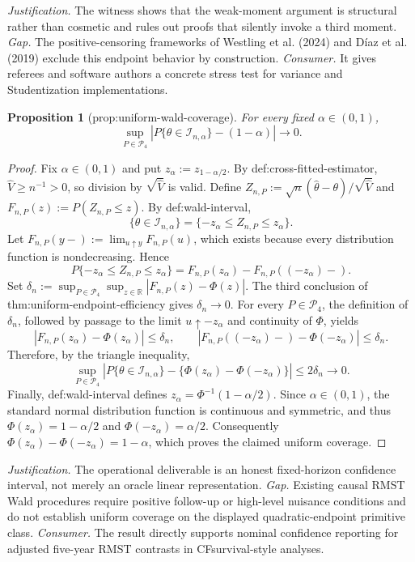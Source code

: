 \documentclass{article}
\newtheorem{proposition}{Proposition}
\begin{document}
\par\smallskip\noindent \textit{Justification.} The witness shows that the weak-moment argument is structural rather than cosmetic and rules out proofs that silently invoke a third moment. \textit{Gap.} The positive-censoring frameworks of Westling et al. (2024) and Díaz et al. (2019) exclude this endpoint behavior by construction. \textit{Consumer.} It gives referees and software authors a concrete stress test for variance and Studentization implementations.

\begin{proposition}[prop:uniform-wald-coverage]\label{prop:uniform-wald-coverage}
For every fixed \(\alpha\in(0,1)\), \[\sup_{P\in\mathcal P_4}\left|P\{\theta\in\mathcal I_{n,\alpha}\}-(1-\alpha)\right|\to0.\]
\end{proposition}
\begin{proof}
Fix \(\alpha\in(0,1)\) and put \(z_\alpha:=z_{1-\alpha/2}\). By def:cross-fitted-estimator, \(\widehat V\ge n^{-1}>0\), so division by \(\sqrt{\widehat V}\) is valid. Define \(Z_{n,P}:=\sqrt n(\widehat\theta-\theta)/\sqrt{\widehat V}\) and \(F_{n,P}(z):=P(Z_{n,P}\le z)\). By def:wald-interval,\[\{\theta\in\mathcal I_{n,\alpha}\}=\{-z_\alpha\le Z_{n,P}\le z_\alpha\}.\]Let \(F_{n,P}(y-) := \lim_{u\uparrow y}F_{n,P}(u)\), which exists because every distribution function is nondecreasing. Hence\[P\{-z_\alpha\le Z_{n,P}\le z_\alpha\}=F_{n,P}(z_\alpha)-F_{n,P}((-z_\alpha)-).\]Set \(\delta_n:=\sup_{P\in\mathcal P_4}\sup_{z\in\mathbb R}|F_{n,P}(z)-\Phi(z)|\). The third conclusion of thm:uniform-endpoint-efficiency gives \(\delta_n\to0\). For every \(P\in\mathcal P_4\), the definition of \(\delta_n\), followed by passage to the limit \(u\uparrow-z_\alpha\) and continuity of \(\Phi\), yields\[|F_{n,P}(z_\alpha)-\Phi(z_\alpha)|\le\delta_n,\qquad |F_{n,P}((-z_\alpha)-)-\Phi(-z_\alpha)|\le\delta_n.\]Therefore, by the triangle inequality,\[\sup_{P\in\mathcal P_4}\left|P\{\theta\in\mathcal I_{n,\alpha}\}-\{\Phi(z_\alpha)-\Phi(-z_\alpha)\}\right|\le2\delta_n\to0.\]Finally, def:wald-interval defines \(z_\alpha=\Phi^{-1}(1-\alpha/2)\). Since \(\alpha\in(0,1)\), the standard normal distribution function is continuous and symmetric, and thus \(\Phi(z_\alpha)=1-\alpha/2\) and \(\Phi(-z_\alpha)=\alpha/2\). Consequently \(\Phi(z_\alpha)-\Phi(-z_\alpha)=1-\alpha\), which proves the claimed uniform coverage.
\end{proof}
\par\smallskip\noindent \textit{Justification.} The operational deliverable is an honest fixed-horizon confidence interval, not merely an oracle linear representation. \textit{Gap.} Existing causal RMST Wald procedures require positive follow-up or high-level nuisance conditions and do not establish uniform coverage on the displayed quadratic-endpoint primitive class. \textit{Consumer.} The result directly supports nominal confidence reporting for adjusted five-year RMST contrasts in CFsurvival-style analyses.
\end{document}
